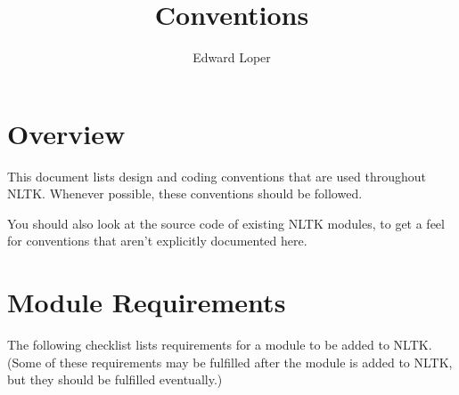 \documentclass{article}
\begin{document}
\title{Conventions}
\author{Edward Loper}
\maketitle

\section{Overview}

This document lists design and coding conventions that are used
throughout NLTK.  Whenever possible, these conventions should be
followed.

You should also look at the source code of existing NLTK modules, to
get a feel for conventions that aren't explicitly documented here.

\section{Module Requirements}

The following checklist lists requirements for a module to be added to
NLTK.  (Some of these requirements may be fulfilled after the module
is added to NLTK, but they should be fulfilled eventually.)
\end{document}
